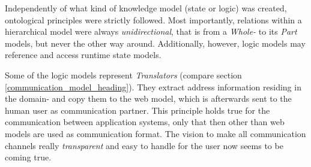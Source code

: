 Independently of what kind of knowledge model (state or logic) was created,
ontological principles were strictly followed. Most importantly, relations
within a hierarchical model were always \emph{unidirectional}, that is from a
\emph{Whole-} to its \emph{Part} models, but never the other way around.
Additionally, however, logic models may reference and access runtime state
models.

Some of the logic models represent \emph{Translators} (compare section
\ref{communication_model_heading}). They extract address information
residing in the domain- and copy them to the web model, which is afterwards
sent to the human user as communication partner. This principle holds true for
the communication between application systems, only that then other than web
models are used as communication format. The vision to make all communication
channels really \emph{transparent} and easy to handle for the user now seems to
be coming true.
